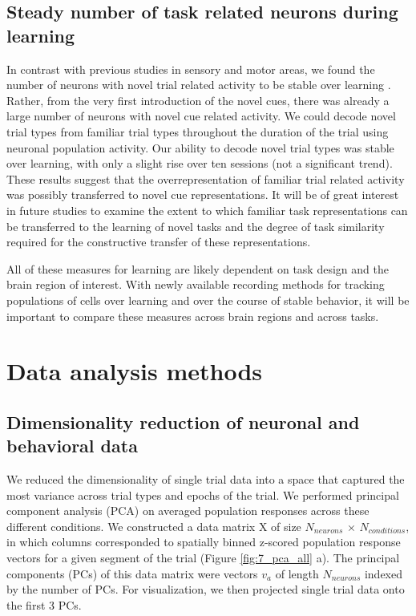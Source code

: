 \subsection{Steady number of task related neurons during learning}
 In contrast with previous studies in sensory and motor areas, we found the number of neurons with novel trial related activity to be stable over learning \citep{Poort2015, Peters2014}. Rather, from the very first introduction of the novel cues, there was already a large number of neurons with novel cue related activity. We could decode novel trial types from familiar trial types throughout the duration of the trial using neuronal population activity. Our ability to decode novel trial types was stable over learning, with only a slight rise over ten sessions (not a significant trend). These results suggest that the overrepresentation of familiar trial related activity was possibly transferred to novel cue representations. It will be of great interest in future studies to examine the extent to which familiar task representations can be transferred to the learning of novel tasks and the degree of task similarity required for the constructive transfer of these representations.

\bigskip

All of these measures for learning are likely dependent on task design and the brain region of interest. With newly available recording methods for tracking populations of cells over learning and over the course of stable behavior, it will be important to compare these measures across brain regions and across tasks.

\section{Data analysis methods}

\subsection{Dimensionality reduction of neuronal and behavioral data}
We reduced the dimensionality of single trial data into a space that captured the most variance across trial types and epochs of the trial. We performed principal component analysis (PCA) on averaged population responses across these different conditions. We constructed a data matrix X of size $N_{neurons}$ $\times$ $N_{conditions}$, in which columns corresponded to spatially binned z-scored population response vectors for a given segment of the trial (Figure \ref{fig:7_pca_all} a). The principal components (PCs) of this data matrix were vectors $v_a$ of length $N_{neurons}$ indexed by the number of PCs. For visualization, we then projected single trial data onto the first 3 PCs. 

